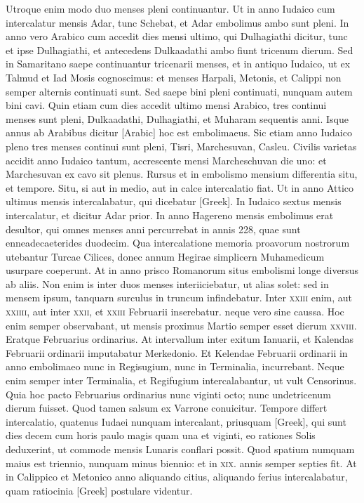 Utroque enim modo duo menses pleni continuantur.
Ut in anno Iudaico cum intercalatur mensis Adar, tunc
Schebat, et Adar embolimus ambo sunt pleni.
In anno vero Arabico
cum accedit dies mensi ultimo, qui Dulhagiathi dicitur, tunc et ipse
Dulhagiathi, et antecedens Dulkaadathi ambo fiunt tricenum dierum.
Sed in Samaritano saepe continuantur tricenarii menses, et in antiquo
Iudaico, ut ex Talmud et Iad Mosis cognoscimus: et menses Harpali,
Metonis, et Calippi non semper alternis continuati sunt.
Sed saepe bini
pleni continuati, nunquam autem bini cavi.
Quin etiam cum dies accedit
ultimo mensi Arabico, tres continui menses sunt pleni, Dulkaadathi,
Dulhagiathi, et Muharam sequentis anni.
Isque annus ab Arabibus
dicitur \textarabic{[Arabic]} hoc est embolimaeus.
Sic etiam anno Iudaico pleno
tres menses continui sunt pleni, Tisri, Marchesuvan, Casleu.
Civilis
varietas accidit anno Iudaico tantum, accrescente mensi Marcheschuvan
die uno: et Marchesuvan ex cavo sit plenus.
Rursus et in embolismo
mensium differentia situ, et tempore.
Situ, si aut in medio, aut in calce
intercalatio fiat.
Ut in anno Attico ultimus mensis intercalabatur, qui
dicebatur \textgreek{[Greek]}.
In Iudaico sextus mensis intercalatur, et
dicitur Adar prior.
In anno Hagereno mensis embolimus erat desultor,
qui omnes menses anni percurrebat in annis 228, quae sunt enneadecaeterides
duodecim.
Qua intercalatione memoria proavorum nostrorum
utebantur Turcae Cilices, donec annum Hegirae simplicern
Muhamedicum usurpare coeperunt.
At in anno prisco Romanorum
situs embolismi longe diversus ab aliis.
Non enim is inter duos
menses interiiciebatur, ut alias solet: sed in mensem ipsum, tanquarn
surculus in truncum infindebatur.
Inter \textsc{xxiii} enim, aut \textsc{xxiiii},
aut inter \textsc{xxii}, et \textsc{xxiii} Februarii inserebatur.
neque vero sine caussa.
Hoc enim semper observabant, ut mensis proximus Martio semper esset
dierum \textsc{xxviii}.
Eratque Februarius ordinarius.
At intervallum inter exitum
Ianuarii, et Kalendas Februarii ordinarii imputabatur Merkedonio.
Et Kelendae Februarii ordinarii in anno embolimaeo nunc in Regisugium,
nunc in Terminalia, incurrebant.
Neque enim semper inter
Terminalia, et Regifugium intercalabantur, ut vult Censorinus.
Quia hoc pacto Februarius ordinarius nunc viginti octo; nunc undetricenum
dierum fuisset.
Quod tamen salsum ex Varrone conuicitur.
Tempore differt intercalatio, quatenus Iudaei nunquam intercalant,
priusquam \textgreek{[Greek]}, qui sunt dies decem cum horis paulo
magis quam una et viginti, eo rationes Solis deduxerint, ut commode
mensis Lunaris conflari possit.
Quod spatium numquam maius est
triennio, nunquam minus biennio: et in \textsc{xix}. annis semper septies fit.
At in Calippico et Metonico anno aliquando citius, aliquando ferius
intercalabatur, quam ratiocinia \textgreek{[Greek]} postulare videntur.

